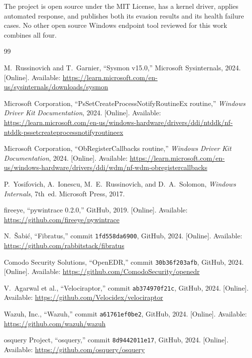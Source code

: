\documentclass[10pt,twocolumn,letterpaper]{article}
\begin{document}
The project is open source under the MIT License, has a kernel driver, applies automated
response, and publishes both its evasion results and its health failure cases. No other
open source Windows endpoint tool reviewed for this work combines all four.

\begin{thebibliography}{99}
\small

M.~Russinovich and T.~Garnier,
``Sysmon v15.0,''
Microsoft Sysinternals, 2024.
[Online]. Available: \url{https://learn.microsoft.com/en-us/sysinternals/downloads/sysmon}

Microsoft Corporation,
``PsSetCreateProcessNotifyRoutineEx routine,''
\emph{Windows Driver Kit Documentation}, 2024.
[Online]. Available: \url{https://learn.microsoft.com/en-us/windows-hardware/drivers/ddi/ntddk/nf-ntddk-pssetcreateprocessnotifyroutineex}

Microsoft Corporation,
``ObRegisterCallbacks routine,''
\emph{Windows Driver Kit Documentation}, 2024.
[Online]. Available: \url{https://learn.microsoft.com/en-us/windows-hardware/drivers/ddi/wdm/nf-wdm-obregistercallbacks}

P.~Yosifovich, A.~Ionescu, M.~E.~Russinovich, and D.~A.~Solomon,
\emph{Windows Internals}, 7th~ed.
Microsoft Press, 2017.

fireeye,
``pywintrace 0.2.0,''
GitHub, 2019.
[Online]. Available: \url{https://github.com/fireeye/pywintrace}

N.~\v{S}abi\'c,
``Fibratus,'' commit \texttt{1fd558da6900},
GitHub, 2024.
[Online]. Available: \url{https://github.com/rabbitstack/fibratus}

Comodo Security Solutions,
``OpenEDR,'' commit \texttt{30b36f203afb},
GitHub, 2024.
[Online]. Available: \url{https://github.com/ComodoSecurity/openedr}

V.~Agarwal et al.,
``Velociraptor,'' commit \texttt{ab374970f21c},
GitHub, 2024.
[Online]. Available: \url{https://github.com/Velocidex/velociraptor}

Wazuh, Inc.,
``Wazuh,'' commit \texttt{a61761ef0be2},
GitHub, 2024.
[Online]. Available: \url{https://github.com/wazuh/wazuh}

osquery Project,
``osquery,'' commit \texttt{8d9442011e17},
GitHub, 2024.
[Online]. Available: \url{https://github.com/osquery/osquery}


\end{thebibliography}
\end{document}
